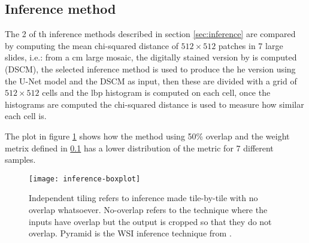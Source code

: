 \documentclass[../main.tex]{subfiles}
\begin{document}
\subsection{Inference method}
The 2 of th inference methods described in section \ref{sec:inference} are
compared by
computing the mean chi-squared distance of $512 \times 512$ patches 
in 7 large slides,
i.e.: from a \gls{cm} large mosaic, the digitally stained
version by \cite{Gareau2009} is computed (DSCM), the selected inference method
is used to produce the \gls{he} version using the U-Net model and the DSCM
as input, then these are divided with a grid of $512 \times 512$ cells and the
\gls{lbp} histogram is computed on each cell, once the histograms are computed
the chi-squared distance is used to measure how similar each cell is.

The plot in figure \ref{fig:inference-comparison} shows how the method using
50\% overlap and the weight metrix defined in \ref{} has a lower distribution
of the metric for 7 different samples.

\begin{figure}
\centering
\texttt{[image: inference-boxplot]}
\caption{Independent tiling refers to inference made tile-by-tile with no overlap
whatsoever. No-overlap refers to the technique where the inputs have overlap but
the output is cropped so that they do not overlap. Pyramid is the WSI inference
technique from \cite{Bel2019}.}
\label{fig:inference-comparison}
\end{figure}

\end{document}
